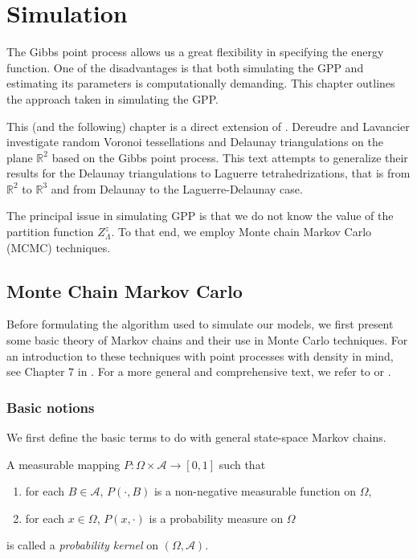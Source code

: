 \chapter{Simulation}\label{ch:simulation}
The Gibbs point process allows us a great flexibility in specifying the energy function. One of the disadvantages is that both simulating the GPP and estimating its parameters is computationally demanding. This chapter outlines the approach taken in simulating the GPP. 

This (and the following) chapter is a direct extension of \cite{DereudreLavancier2011}. Dereudre and Lavancier investigate random Voronoi tessellations and Delaunay triangulations on the plane $\mathbb R^2$ based on the Gibbs point process. This text attempts to generalize their results for the Delaunay triangulations to Laguerre tetrahedrizations, that is from $\mathbb R^2$ to $\mathbb R^3$ and from Delaunay to the Laguerre-Delaunay case.

\noindent The principal issue in simulating GPP is that we do not know the value of the partition function $Z^z_\Lambda$. To that end, we employ Monte chain Markov Carlo (MCMC) techniques. 

\section{Monte Chain Markov Carlo}
Before formulating the algorithm used to simulate our models, we first present some basic theory of Markov chains and their use in Monte Carlo techniques. For an introduction to these techniques with point processes with density in mind, see Chapter $7$ in \cite{MollerWaagepetersen2003}. For a more general and comprehensive text, we refer to \cite{RobertCasella2004} or \cite{MeynTweedie1993}.

\subsection{Basic notions}
We first define the basic terms to do with general state-space Markov chains.

\begin{definition}
A measurable mapping $P:\Omega\times \mathcal A \to [0,1]$ such that
\begin{enumerate}
\item for each $B \in \mathcal A$, $P(\cdot, B)$ is a non-negative measurable function on $\Omega$,
\item for each $x \in \Omega$, $P(x,\cdot)$ is a probability measure on $\Omega$
\end{enumerate}
is called a \textit{probability kernel} on $(\Omega, \mathcal A)$.
\end{definition}

